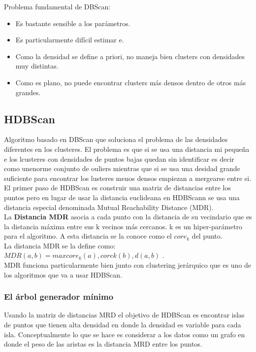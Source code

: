 \documentclass[titlepage,a4paper]{article}
\begin{document}
 Problema fundamental de DBScan:
\begin{itemize}
\item Es bastante sensible a los parámetros.
\item Es particularmente difícil estimar e.
\item Como la densidad se define a priori, no maneja bien clusters con densidades muy distintas.
\item Como es plano, no puede encontrar clusters más densos dentro de otros más grandes.
\end{itemize}

\subsection*{HDBScan}
Algoritmo basado en DBScan que soluciona el problema de las densidades diferentes en los clusteres. El problema es que si se usa una distancia mi pequeña e los lcusteres con densidades de puntos bajas quedan sin identificar es decir como unenorme conjunto de ouliers mientras que si se usa una desidad grande suficiente para encontrar los lusteres menos densos empiezan a mergearse entre si. \\

El primer paso de HDBScan es construir una matriz de distancias entre los puntos pero en lugar de usar la distancia euclideana en HDBScann se usa una distancia especial denominada Mutual Reachability Distance (MDR).\\

La \textbf{Distancia MDR} asocia a cada punto con la distancia de su vecindario que es la distancia máxima entre sus k vecinos más cercanos. k es un hiper-parámetro para el algoritmo. A esta distancia se la conoce como el $core_k$ del punto. \\

La distancia MDR se la define como: $MDR(a,b) = max{core_k(a),corek(b), d(a,b)}$ . \\

MDR funciona particularmente bien junto con clustering jerárquico que es uno de los algoritmos que va a usar HDBScan. 

\subsubsection*{El árbol generador mínimo}
Usando la matriz de distancias MRD el objetivo de HDBScan es encontrar islas de puntos que tienen alta densidad en donde la densidad es variable para cada isla. Conceptualmente lo que se hace es considerar a los datos como un grafo en donde el peso de las aristas es la distancia MRD entre los puntos. \\
\end{document}
